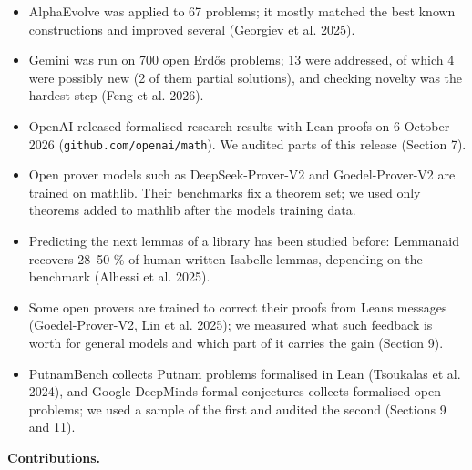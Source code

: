 \documentclass[11pt,a4paper]{article}
\providecommand{\tightlist}{\setlength{\itemsep}{0pt}\setlength{\parskip}{0pt}}
\begin{document}
\begin{itemize}
\tightlist
\item
  AlphaEvolve was applied to 67 problems; it mostly matched the best known constructions and improved several (Georgiev et al. 2025).
\item
  Gemini was run on 700 open Erdős problems; 13 were addressed, of which 4 were possibly new (2 of them partial solutions), and checking novelty was the hardest step (Feng et al. 2026).
\item
  OpenAI released formalised research results with Lean proofs on 6 October 2026 (\nolinkurl{github.com/openai/math}). We audited parts of this release (Section 7).
\item
  Open prover models such as DeepSeek-Prover-V2 and Goedel-Prover-V2 are trained on mathlib. Their benchmarks fix a theorem set; we used only theorems added to mathlib after the models\textquotesingle{} training data.
\item
  Predicting the next lemmas of a library has been studied before: Lemmanaid recovers 28--50 \% of human-written Isabelle lemmas, depending on the benchmark (Alhessi et al. 2025).
\item
  Some open provers are trained to correct their proofs from Lean\textquotesingle s messages (Goedel-Prover-V2, Lin et al. 2025); we measured what such feedback is worth for general models and which part of it carries the gain (Section 9).
\item
  PutnamBench collects Putnam problems formalised in Lean (Tsoukalas et al. 2024), and Google DeepMind\textquotesingle s formal-conjectures collects formalised open problems; we used a sample of the first and audited the second (Sections 9 and 11).
\end{itemize}

\textbf{Contributions.}
\end{document}
